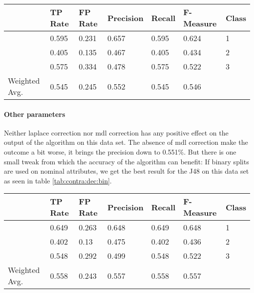 \documentclass[paper=a4, fontsize=11pt]{scrartcl} %
\numberwithin{equation}{section} %
\numberwithin{figure}{section} %
\numberwithin{table}{section} %
\begin{document}
\begin{table*}[htb]\centering
  \begin{tabular*}{\columnwidth}{@{}lllllll@{}}
      \toprule 
              &   TP Rate & FP Rate & Precision & Recall & F-Measure &  Class \\ \midrule      
              &   0.595   & 0.231   & 0.657     & 0.595  & 0.624     &  1     \\      
              &   0.405   & 0.135   & 0.467     & 0.405  & 0.434     &  2     \\      
              &   0.575   & 0.334   & 0.478     & 0.575  & 0.522     &  3     \\      
Weighted Avg. &   0.545   & 0.245   & 0.552     & 0.545  & 0.546     &        \\ \bottomrule     
    \end{tabular*}
\caption{Decision Tree on Contraceptive Data Set -- at least 23 instances per leaf} 
\label{tab:contra:dec:23l}
\end{table*}
\FloatBarrier
\paragraph{Other parameters}
Neither laplace correction nor mdl correction has any positive effect on the output of the algorithm on this data set. The absence of mdl correction make the outcome a bit worse, it brings the precision down to 0.551\%.  But there is one small tweak from which the accuracy of the algorithm can benefit: If binary splits are used on nominal attributes, we get the best result for the J48 on this data set as seen in table \ref{tab:contra:dec:bin}.

 
\begin{table*}[htb]\centering
  \begin{tabular*}{\columnwidth}{@{}lllllll@{}}
      \toprule 
               &  TP Rate & FP Rate & Precision & Recall & F-Measure &  Class \\ \midrule   
               &  0.649   & 0.263   & 0.648     & 0.649  & 0.648     &  1     \\    
               &  0.402   & 0.13    & 0.475     & 0.402  & 0.436     &  2     \\        
               &  0.548   & 0.292   & 0.499     & 0.548  & 0.522     &  3     \\    
Weighted Avg.  &  0.558   & 0.243   & 0.557     & 0.558  & 0.557     &        \\ \bottomrule 
    \end{tabular*}
\caption{Decision Tree on Contraceptive Data Set -- using binary splits} 
\label{tab:contra:dec:bin}
\end{table*}
\FloatBarrier
\end{document}
